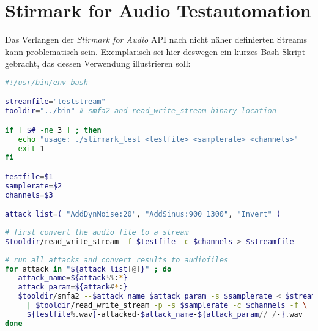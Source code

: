 \chapter{Stirmark for Audio Testautomation}
\label{ch:stirmarkaudio}

Das Verlangen der \textit{Stirmark for Audio} API nach nicht näher definierten Streams kann problematisch sein. Exemplarisch sei hier deswegen ein kurzes Bash-Skript gebracht, das dessen Verwendung illustrieren soll:
      
\begin{lstlisting}[language=bash,
				   caption=Anwendungsbeispiel für Stirmark for Audio,
				   captionpos=b]
#!/usr/bin/env bash

streamfile="teststream"
tooldir="../bin" # smfa2 and read_write_stream binary location

if [ $# -ne 3 ] ; then
   echo "usage: ./stirmark_test <testfile> <samplerate> <channels>"
   exit 1
fi

testfile=$1
samplerate=$2
channels=$3

attack_list=( "AddDynNoise:20", "AddSinus:900 1300", "Invert" )
			
# first convert the audio file to a stream
$tooldir/read_write_stream -f $testfile -c $channels > $streamfile
 
# run all attacks and convert results to audiofiles
for attack in "${attack_list[@]}" ; do
   attack_name=${attack%%:*}
   attack_param=${attack#*:}
   $tooldir/smfa2 --$attack_name $attack_param -s $samplerate < $streamfile \
     | $tooldir/read_write_stream -p -s $samplerate -c $channels -f \
     ${testfile%.wav}-attacked-$attack_name-${attack_param// /-}.wav
done
\end{lstlisting}









